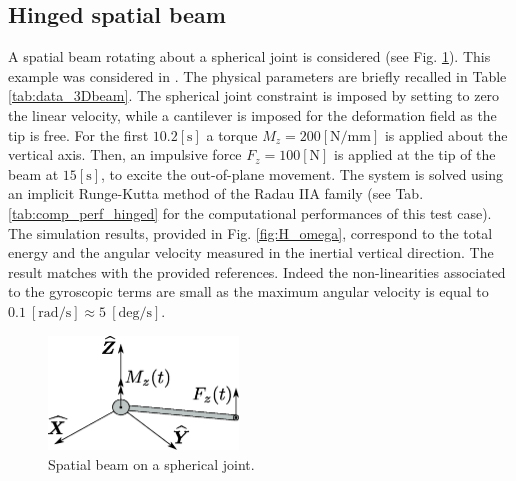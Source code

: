 \documentclass{svjour3}                     %
\newcommand{\secondRev}[1]{\textcolor{blue!80!black}{#1}}
\begin{document}
	\subsection{Hinged spatial beam}
	A spatial beam rotating about a spherical joint is considered (see Fig. \ref{fig:beam_3D}). This example was considered in \cite{Cardona2000,Ellenbroek2018}. The physical parameters are briefly recalled in Table \ref{tab:data_3Dbeam}. The spherical joint constraint is imposed by setting to zero the linear velocity, while a cantilever is imposed for the deformation field as the tip is free. For the first $10.2 [\mathrm{s}]$ a torque $ M_z =200 [\mathrm{N/mm}]$ is applied about the vertical axis. Then, an impulsive force $ F_z =100 [\mathrm{N}]$ is applied at the tip of the beam at $15 [\mathrm{s}]$, to excite the out-of-plane movement. The system is solved using an implicit Runge-Kutta method of the Radau IIA family \secondRev{(see Tab. \ref{tab:comp_perf_hinged} for the computational performances of this test case)}. The simulation results, provided in Fig. \ref{fig:H_omega}, correspond to the total energy and the angular velocity measured in the inertial vertical direction. The result matches with the provided references. Indeed the non-linearities associated to the gyroscopic terms are small as the maximum angular velocity is equal to $0.1 \ [\mathrm{rad/s}] \approx 5 \ [\mathrm{deg/s}]$. 
	
	\begin{figure}[tb]
		\centering
		\includegraphics[width=0.45\textwidth]{rotbeam_3D.eps} 
		\caption{Spatial beam on a spherical joint.}
		\label{fig:beam_3D}
	\end{figure}
	
\end{document}
